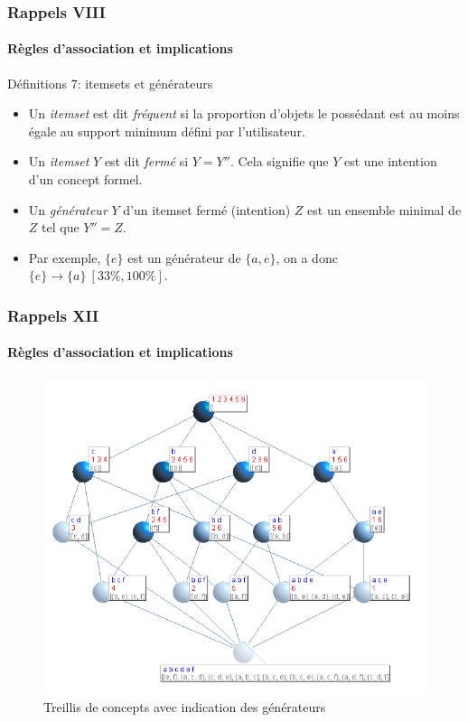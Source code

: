 \documentclass[french]{beamer}
\begin{document}
\begin{frame}
\frametitle{Rappels VIII}
\framesubtitle{Règles d'association et implications}
\begin{block}{Définitions 7: itemsets et générateurs}
\begin{itemize}
\item Un \emph{itemset} est dit \emph{fréquent} si la proportion d'objets le possédant est au moins égale au support minimum défini par l'utilisateur.
\item Un \emph{itemset} $Y$ est dit \emph{fermé} si $Y = Y''$. Cela signifie que $Y$ est une intention d'un concept formel.
\item Un \emph{générateur} $Y$ \parencite{Pfaltz2002, Pasquier1999} d'un itemset fermé (intention) $Z$ est un ensemble minimal de  $Z$ tel que $Y''= Z$.
\end{itemize}
\end{block}
\begin{itemize}
  \item Par exemple, $\{e\}$ est un générateur de $\{a,e\}$, on a donc $\{e\} \rightarrow \{a\}\ [33\%,100\%]$.
\end{itemize}
\end{frame}

\begin{frame}
\frametitle{Rappels XII}
\framesubtitle{Règles d'association et implications}
\begin{figure}[H]
\label{cap:fig:treillis-gen}
\begin{center}\includegraphics[scale=0.36]{figures/Treillis21FullLabelGen.png}\end{center}
\caption{Treillis de concepts avec indication des générateurs}
\end{figure}
\end{frame}
\end{document}
